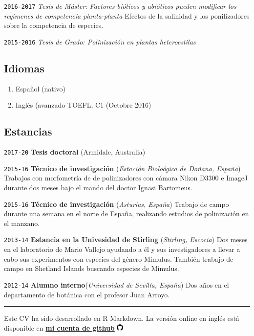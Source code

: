 \documentclass[
]{article}
\begin{document}
\texttt{2016-2017} \emph{Tesis de Máster: Factores bióticos y abióticos
pueden modificar los regímenes de competencia planta-planta} Efectos de
la salinidad y los ponilizadores sobre la competencia de especies.

\texttt{2015-2016} \emph{Tesis de Grado: Polinización en plantas
heteroestilas}

\hypertarget{idiomas}{%
\subsection{Idiomas}\label{idiomas}}

\begin{enumerate}
\def\labelenumi{\arabic{enumi}.}
\item
  Español (nativo)
\item
  Inglés (avanzado TOEFL, C1 (Octobre 2016)
\end{enumerate}

\hypertarget{estancias}{%
\subsection{Estancias}\label{estancias}}

\texttt{2017-20} \textbf{Tesis doctoral} (Armidale, Australia)

\texttt{2015-16} \textbf{Técnico de investigación} (\emph{Estación
Bioloógica de Doñana, España}) Trabajos con morfometría de de
polinizadores con cámara Nikon D3300 e ImageJ durante dos meses bajo el
mando del doctor Ignasi Bartomeus.

\texttt{2015-16} \textbf{Técnico de investigación} (\emph{Asturias,
España}) Trabajo de campo durante una semana en el norte de España,
realizando estudios de polinización en el manzano.

\texttt{2013-14} \textbf{Estancia en la Univesidad de Stirling}
(\emph{Stirling, Escocia}) Dos meses en el laboratorio de Mario Vallejo
ayudando a él y sus investigadores a llevar a cabo sus experimentos con
especies del género Mimulus. También trabajo de campo en Shetland
Islands buscando especies de Mimulus.

\texttt{2012-14} \textbf{Alumno interno}(\emph{Universidad de Sevilla,
España}) Dos años en el departamento de botánica con el profesor Juan
Arroyo.

\begin{center}\rule{0.5\linewidth}{0.5pt}\end{center}

Este CV ha sido desarrollado en R Markdown. La versión online en inglés
está disponible en
\href{https://github.com/JoseBSL/CV/blob/master/cv.Rmd}{\textbf{mi
cuenta de github}}
\includegraphics[width=0.025\textwidth,height=\textheight]{gitlogo.png}
\end{document}

